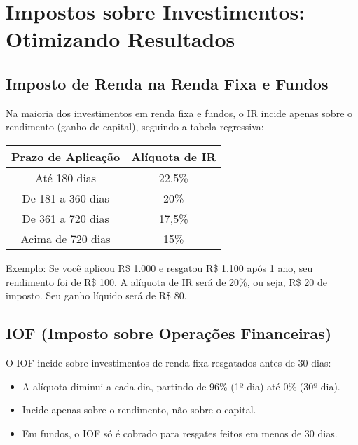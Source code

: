 \chapter{Impostos sobre Investimentos: Otimizando Resultados}

\section{Imposto de Renda na Renda Fixa e Fundos}

\noindent Na maioria dos investimentos em renda fixa e fundos, o IR incide apenas sobre o rendimento (ganho de capital), seguindo a tabela regressiva:

\begin{center}
\begin{tabular}{|c|c|}
\hline
\textbf{Prazo de Aplicação} & \textbf{Alíquota de IR} \\
\hline
Até 180 dias & 22,5\% \\
\hline
De 181 a 360 dias & 20\% \\
\hline
De 361 a 720 dias & 17,5\% \\
\hline
Acima de 720 dias & 15\% \\
\hline
\end{tabular}
\end{center}

\vspace{0.3cm}
\noindent Exemplo: Se você aplicou R\$ 1.000 e resgatou R\$ 1.100 após 1 ano, seu rendimento foi de R\$ 100. A alíquota de IR será de 20\%, ou seja, R\$ 20 de imposto. Seu ganho líquido será de R\$ 80.

\section{IOF (Imposto sobre Operações Financeiras)}

\noindent O IOF incide sobre investimentos de renda fixa resgatados antes de 30 dias:

\begin{itemize}[leftmargin=*]
    \item A alíquota diminui a cada dia, partindo de 96\% (1º dia) até 0\% (30º dia).
    \item Incide apenas sobre o rendimento, não sobre o capital.
    \item Em fundos, o IOF só é cobrado para resgates feitos em menos de 30 dias.
\end{itemize}

